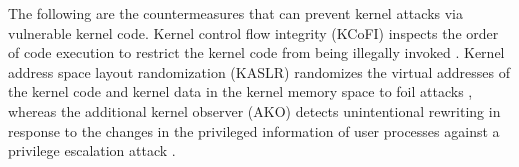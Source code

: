 The following are the countermeasures that can prevent kernel attacks via
vulnerable kernel code. Kernel control flow integrity (KCoFI)
inspects the order of code execution \cite{abadi05ccs} to restrict the
kernel code from being illegally invoked \cite{criswell14sp}.
Kernel address space layout randomization (KASLR) randomizes the virtual
addresses of the kernel code and kernel data in the kernel memory space to foil
attacks \cite{shacham04ccs}, whereas
%
the additional kernel observer (AKO) detects unintentional rewriting in response
to the changes in the privileged information of user processes against a privilege
escalation attack \cite{yamauchi21ijis}.

